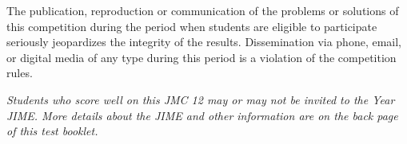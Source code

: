 \documentclass[10pt, twoside]{article}
\newcommand{\contestName}{JMC}
\newcommand{\contestNumber}{12}
\newcommand{\JIMEName}{JIME}
\newcommand{\JIMEYear}{Year}
\begin{document}
\begin{justify}
{\vspace{-6mm}

\begin{justify}
The publication, reproduction or communication of the problems or solutions of this competition during the period when students are eligible to participate seriously jeopardizes the integrity of the results. Dissemination via phone, email, or digital media of any type during this period is a violation of the competition rules.
\end{justify}

\vspace{-6mm}

\begin{justify}
\textit{Students who score well on this {\contestName} {\contestNumber} may or may not be invited to the {\JIMEYear} {\JIMEName}. More details about the {\JIMEName} and other information are on the back page of this test booklet.}
\end{justify}}

\end{justify}

\restoregeometry

\newpage
\end{document}

